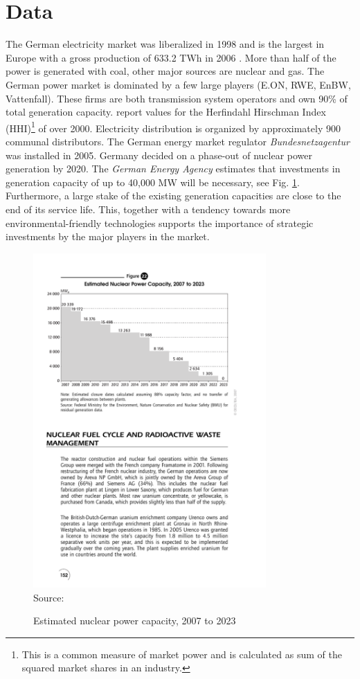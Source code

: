 \section{Data}

The German electricity market was liberalized in 1998 and is the largest in Europe with a gross production of 633.2 TWh in 2006 \citep{IEA2007}. More than half of the power is generated with coal, other major sources are nuclear and gas. The German power market is dominated by a few large players (E.ON, RWE, EnBW, Vattenfall). These firms are both transmission system operators and own 90\% of total generation capacity. \cite{Brunekreeft2006} report values for the Herfindahl Hirschman Index (HHI)\footnote{This is a common measure of market power and is calculated as sum of the squared market shares in an industry.} of over 2000. Electricity distribution is organized by approximately 900 communal distributors. The German energy market regulator  \emph{Bundesnetzagentur} was installed in 2005. Germany decided on a phase-out of nuclear power generation by 2020. The \emph{German Energy Agency} estimates that investments in generation capacity of up to 40,000 MW will be necessary, see Fig. \ref{fig:nuclear}. Furthermore, a large stake of the existing generation capacities are close to the end of its service life. This, together with a tendency towards more environmental-friendly technologies supports the importance of strategic investments by the major players in the market. 

\begin{figure}[htb]
  \centering
\caption{Estimated nuclear power capacity, 2007 to 2023}
\includegraphics[width=3.5in]{germandata/nuclear.pdf}
  \label{fig:nuclear}
\\
 \scriptsize Source: \cite{IEA2007a}
\end{figure}

